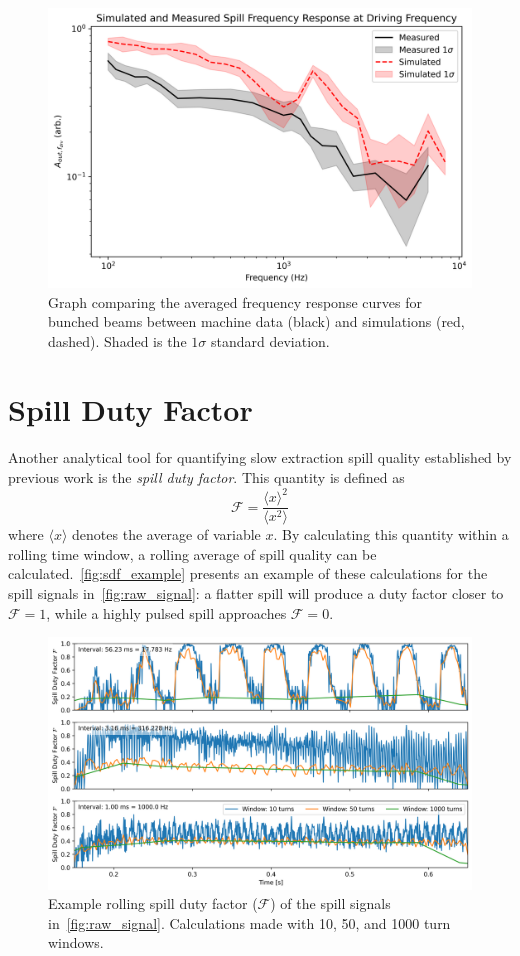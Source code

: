 \documentclass[11pt]{report}
\begin{document}
\begin{figure}[!h]
  \includegraphics*[width=0.9\linewidth]{simvmeas_bunched.png}
  \caption{Graph comparing the averaged frequency response curves for bunched beams between machine data (black) and simulations (red, dashed). Shaded is the $1\sigma$ standard deviation.}\label{fig:simvmeas_bunched}
\end{figure}

\clearpage
\section{Spill Duty Factor}\label{results:sdf}

Another analytical tool for quantifying slow extraction spill quality established by previous work is the \textit{spill duty factor}. This quantity is defined as~\cite{Sorge_2018}
\begin{equation}
  \mathcal{F} = \frac{\langle x\rangle^2}{\langle x^2\rangle}
\end{equation} where $\langle x\rangle$ denotes the average of variable $x$. By calculating this quantity within a rolling time window, a rolling average of spill quality can be calculated.~\autoref{fig:sdf_example} presents an example of these calculations for the spill signals in~\autoref{fig:raw_signal}: a flatter spill will produce a duty factor closer to $\mathcal{F}=1$, while a highly pulsed spill approaches $\mathcal{F}=0$.

\begin{figure}
  \centering
  \includegraphics[width=0.8\linewidth]{sdfs.png}
  \caption{Example rolling spill duty factor ($\mathcal{F}$) of the spill signals in~\autoref{fig:raw_signal}. Calculations made with 10, 50, and 1000 turn windows.}\label{fig:sdf_example}
\end{figure}
\end{document}
